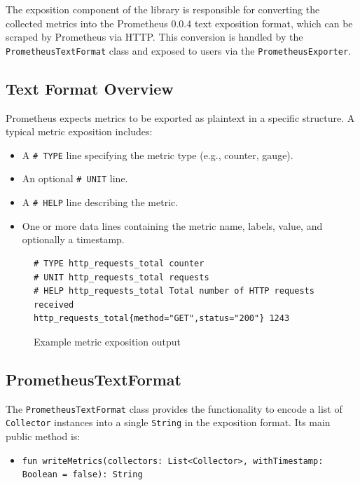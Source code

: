 The exposition component of the library is responsible for converting the collected metrics into the Prometheus 0.0.4 text exposition format, which can be scraped by Prometheus via HTTP. This conversion is handled by the \texttt{PrometheusTextFormat} class and exposed to users via the \texttt{PrometheusExporter}.

\subsection{Text Format Overview}\label{subsec:text-format-overview}

Prometheus expects metrics to be exported as plaintext in a specific structure.
A typical metric exposition includes:

\begin{itemize}
    \item A \texttt{\# TYPE} line specifying the metric type (e.g., counter, gauge).
    \item An optional \texttt{\# UNIT} line.
    \item A \texttt{\# HELP} line describing the metric.
    \item One or more data lines containing the metric name, labels, value, and optionally a timestamp.
\end{itemize}

\begin{figure}[h]
    \begin{lstlisting}
# TYPE http_requests_total counter
# UNIT http_requests_total requests
# HELP http_requests_total Total number of HTTP requests received
http_requests_total{method="GET",status="200"} 1243
    \end{lstlisting}
    \caption{Example metric exposition output}
\end{figure}

\subsection{PrometheusTextFormat}\label{subsec:prometheustextformat}

The \texttt{PrometheusTextFormat} class provides the functionality to encode a list of \texttt{Collector} instances into a single \texttt{String} in the exposition format.
Its main public method is:

\begin{itemize}
    \item \texttt{fun writeMetrics(collectors: List<Collector>, withTimestamp: Boolean = false): String}
\end{itemize}

